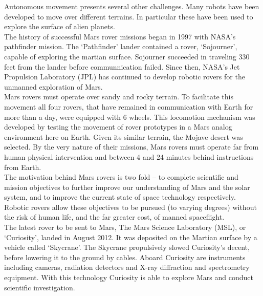     Autonomous movement presents several other challenges. Many robots have been developed to move over different terrains. In particular these have been used to explore the surface of alien planets.\\
    The history of successful Mars rover missions began in 1997 with NASA's pathfinder mission. The `Pathfinder' lander contained a rover, `Sojourner', capable of exploring the martian surface. Sojourner succeeded in traveling 330 feet from the lander before communnication failed.\cite{MSUsojourner} Since then, NASA's Jet Propulsion Laboratory (JPL) has continued to develop robotic rovers for the unmanned exploration of Mars.\\
    Mars rovers must operate over sandy and rocky terrain. To facilitate this movement all four rovers, that have remained in communication with Earth for more than a day, were equipped with 6 wheels. This locomotion mechanism was developed by testing the movement of rover prototypes in a Mars analog environment here on Earth. Given its similar terrain, the Mojave desert was selected. By the very nature of their missions, Mars rovers must operate far from human physical intervention and between 4 and 24 minutes behind instructions from Earth.\cite{Ormston}\\
    The motivation behind Mars rovers is two fold -- to complete scientific and mission objectives to further improve our understanding of Mars and the solar system, and to improve the current state of space technology respectively. Robotic rovers allow these objectives to be pursued (to varying degrees) without the risk of human life, and the far greater cost, of manned spaceflight.\\
    The latest rover to be sent to Mars, The Mars Science Laboratory (MSL), or `Curiosity', landed in August 2012.\cite{NASAcuriosity} It was deposited on the Martian surface by a vehicle called `Skycrane'. The Skycrane propulsively slowed Curiosity's decent, before lowering it to the ground by cables. Aboard Curiosity are instruments including cameras, radiation detectors and X-ray diffraction and spectrometry equipment. With this technology Curiosity is able to explore Mars and conduct scientific investigation.

